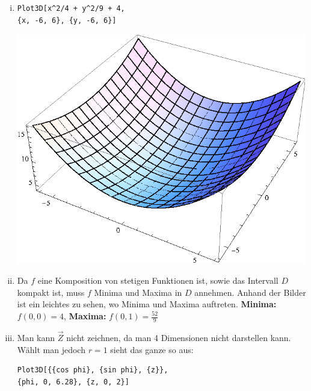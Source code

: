 \documentclass[10pt,a4paper]{scrartcl}
\begin{document}
\begin{enumerate}[(i)]
\item 
\begin{minipage}{0.49\columnwidth}
\begin{lstlisting}
Plot3D[x^2/4 + y^2/9 + 4, 
{x, -6, 6}, {y, -6, 6}]
\end{lstlisting}
\end{minipage}
\begin{minipage}{0.50\columnwidth}
\includegraphics[scale=0.7]{1ii.eps} 
\end{minipage}
\item 
Da $f$ eine Komposition von stetigen Funktionen ist, sowie das Intervall $D$ kompakt ist, muss $f$ Minima und Maxima in $D$ annehmen. Anhand der Bilder ist ein leichtes zu sehen, wo Minima und Maxima auftreten. \textbf{Minima: } $f(0,0) = 4$, \textbf{Maxima: } $f(0,1) = \frac{52}{9}$
\item 
Man kann $\vec{Z}$ nicht zeichnen, da man 4 Dimensionen nicht darstellen kann. Wählt man jedoch $r=1$ sieht das ganze so aus: \\
\begin{minipage}{0.49\columnwidth}
\begin{lstlisting}
Plot3D[{{cos phi}, {sin phi}, {z}}, 
{phi, 0, 6.28}, {z, 0, 2}]
\end{lstlisting}
\end{minipage}
\begin{minipage}{0.50\columnwidth}

\end{minipage}
\end{enumerate}
\end{document}
